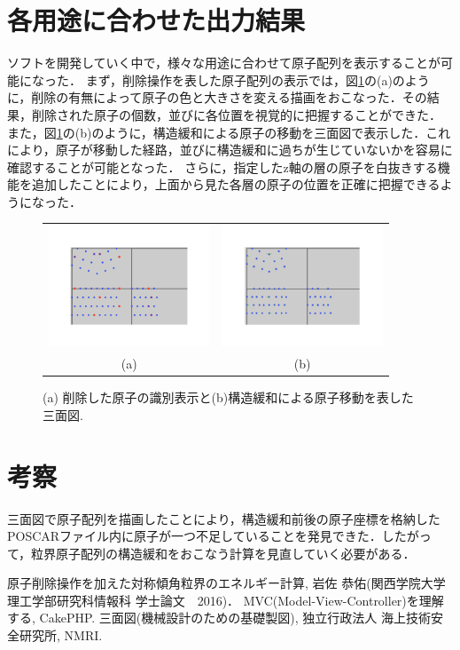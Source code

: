 \documentclass[a4j,twocolumn]{jsarticle}
\begin{document}
\section{各用途に合わせた出力結果}
ソフトを開発していく中で，様々な用途に合わせて原子配列を表示することが可能になった． まず，削除操作を表した原子配列の表示では，図\ref{fig:two}の(a)のように，削除の有無によって原子の色と大きさを変える描画をおこなった．その結果，削除された原子の個数，並びに各位置を視覚的に把握することができた． また，図\ref{fig:two}の(b)のように，構造緩和による原子の移動を三面図で表示した．これにより，原子が移動した経路，並びに構造緩和に過ちが生じていないかを容易に確認することが可能となった． さらに，指定したz軸の層の原子を白抜きする機能を追加したことにより，上面から見た各層の原子の位置を正確に把握できるようになった．

\begin{figure}[h]
\begin{center}
\begin{tabular}{cc}
   \includegraphics[width=48mm]{deleted_found.jpeg} &
   \includegraphics[width=48mm]{change_position.jpeg} \\
   (a) & (b)
\end{tabular}
  \caption{(a) 削除した原子の識別表示と(b)構造緩和による原子移動を表した三面図.}
  \label{fig:two}
\end{center}
\end{figure}


\section{考察}
三面図で原子配列を描画したことにより，構造緩和前後の原子座標を格納したPOSCARファイル内に原子が一つ不足していることを発見できた．したがって，粒界原子配列の構造緩和をおこなう計算を見直していく必要がある．

\begin{thebibliography}{9}
 原子削除操作を加えた対称傾角粒界のエネルギー計算, 岩佐 恭佑(関西学院大学 理工学部研究科情報科 学士論文　2016)． 
 MVC(Model-View-Controller)を理解する, CakePHP.
 三面図(機械設計のための基礎製図), 独立行政法人 海上技術安全研究所, NMRI.
\end{thebibliography}
\end{document}
